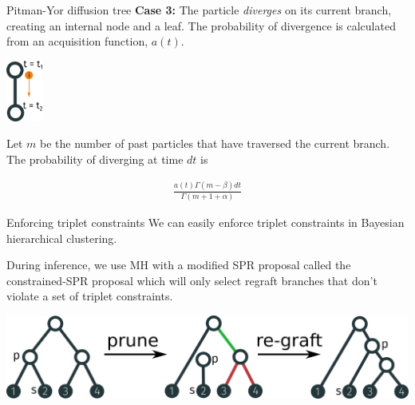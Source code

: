 \documentclass[10pt, compress]{beamer}
\begin{document}
\begin{frame}{Pitman-Yor diffusion tree}
  \textbf{Case 3:} 
  The particle \emph{diverges} on its current branch,
  creating an internal node and a leaf.
  The probability of divergence is calculated from
  an \alert{acquisition function}, $a(t)$.

  \begin{center}
      \includegraphics[width=0.09\textwidth]{img/ddt-4}
  \end{center}

  \pause

  Let $m$ be the number of past particles that have traversed the current branch.
  The probability of diverging at time $dt$ is

  \pause

  \begin{align}
    \frac{a(t)\Gamma(m - \beta)dt}{\Gamma(m + 1 + \alpha)}
  \end{align}

\end{frame}
\begin{frame}{Enforcing triplet constraints}
  We can easily enforce triplet constraints
  in Bayesian hierarchical clustering.

  During inference, we use MH with a modified SPR proposal called
  the constrained-SPR proposal which will
  only select regraft branches
  that don't violate a set of
  triplet constraints.

    \pause

  \begin{center}
    \includegraphics[width=\textwidth]{img/cspr-animation}
  \end{center}
\end{frame}
\end{document}
